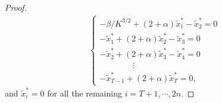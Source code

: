 \begin{proof}
\begin{align}
    \begin{cases}
        -\beta / K^{3/2} + (2 + \alpha)  \tilde x_1^* - \tilde x_2^* = 0 \\
        - \tilde x_1^* + (2+ \alpha) \tilde x_2^* - \tilde x_3^* = 0 \\
        - \tilde x_2^* + (2+ \alpha) \tilde x_3^* - \tilde x_4^* = 0  \\
        \quad \quad \quad \quad \vdots \\
        - \tilde x_{T-1}^* + (2+ \alpha) \tilde x_{T}^* = 0,
    \end{cases}
\end{align}
and $\tilde x_{i}^* =0 $ for all the remaining $i = T+1,\cdots, 2n$.


\end{proof}
